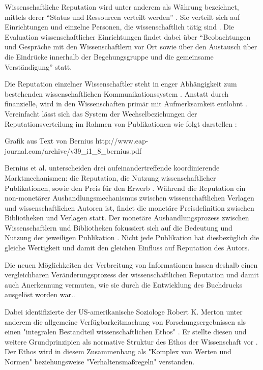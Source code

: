 Wissenschaftliche Reputation wird unter anderem als Währung bezeichnet, mittels derer “Status und Ressourcen verteilt werden” \cite{hanekop_2006}. Sie verteilt sich auf Einrichtungen und einzelne Personen, die wissenschaftlich tätig sind \cite{suchen}. Die Evaluation wissenschaftlicher Einrichtungen findet dabei über “Beobachtungen und Gespräche mit den Wissenschaftlern vor Ort sowie über den Austausch über die Eindrücke innerhalb der Begehungsgruppe und die gemeinsame Verständigung”\cite{Barl_sius_2008} statt. 

Die Reputation einzelner Wissenschaftler steht in enger Abhängigkeit zum bestehenden wissenschaftlichen Kommunikationssystem \cite{suchen}. Anstatt durch finanzielle, wird in den Wissenschaften primär mit Aufmerksamkeit entlohnt \cite{suchen}. Vereinfacht lässt sich das System der Wechselbeziehungen der Reputationsverteilung im Rahmen von Publikationen wie folgt darstellen \cite{cite:21a}: 

Grafik aus Text von Bernius
http://www.eap-journal.com/archive/v39_i1_8_bernius.pdf

Bernius et al. unterscheiden drei aufeinandertreffende koordinierende Marktmechanismen: die Reputation, die Nutzung wissenschaftlicher Publikationen, sowie den Preis für den Erwerb \cite{suchen}. Während die Reputation ein non-monetärer Aushandlungsmechanismus zwischen wissenschaftlichen Verlagen und wissenschaftlichen Autoren ist, findet die monetäre Preisdefinition zwischen Bibliotheken und Verlagen statt. Der monetäre Aushandlungsprozess zwischen Wissenschaftlern und Bibliotheken fokussiert sich auf die Bedeutung und Nutzung der jeweiligen Publikation \cite{cite:21a}. Nicht jede Publikation hat diesbezüglich die gleiche Wertigkeit \cite{suchen} und damit den gleichen Einfluss auf Reputation des Autors. 

Die neuen Möglichkeiten der Verbreitung von Informationen lassen deshalb einen vergleichbaren Veränderungsprozess der wissenschaftlichen Reputation und damit auch Anerkennung vermuten, wie sie durch die Entwicklung des Buchdrucks ausgelöst worden war.\cite{hanekop_2006}. 

Dabei identifizierte der US-amerikanische Soziologe Robert K. Merton unter anderem die allgemeine Verfügbarkeitmachung von Forschungsergebnissen als einen "integralen Bestandteil wissenschaftlichen Ethos" \cite{Fangerau_2014}. Er stellte diesen und weitere Grundprinzipien als normative Struktur des Ethos der Wissenschaft vor \cite{Merton_1985}. Der Ethos wird in diesem Zusammenhang als "Komplex von Werten und Normen"\cite{suchen} beziehungsweise "Verhaltensmaßregeln"\cite{suchen} verstanden.

